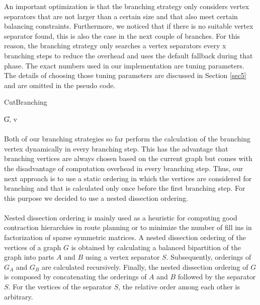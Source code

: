 \documentclass[]{article}
\begin{document}
An important optimization is that the branching strategy only considers vertex separators that are not larger than a certain size and that also meet certain balancing constraints. Furthermore, we noticed that if there is no suitable vertex separator found, this is also the case in the next couple of branches. For this reason, the branching strategy only searches a vertex separators every x branching steps to reduce the overhead and uses the default fallback during that phase. The exact numbers used in our implementation are tuning parameters. The details of choosing those tuning parameters are discussed in Section \ref{sec5} and are omitted in the pseudo code. 

\begin{algorithm}
	\caption{CutBranching}\label{alg:cut_strat}
	\DontPrintSemicolon
	
	
	\U{G, v}	
	
	
\end{algorithm}
\paragraph{}
Both of our branching strategies so far perform the calculation of the branching vertex dynamically in every branching step. This has the advantage that branching vertices are always chosen based on the current graph but comes with the disadvantage of computation overhead in every branching step. Thus, our next approach is to use a static ordering in which the vertices are considered for branching and that is calculated only once before the first branching step. For this purpose we decided to use a nested dissection ordering.

\paragraph{}
Nested dissection ordering is mainly used as a heuristic for computing good contraction hierarchies in route planning or to minimize the number of fill ins in factorization of sparse symmetric matrices.  A nested dissection ordering of the vertices of a graph $G$ is obtained by calculating a balanced bipartition of the graph into parts $A$ and $B$ using a vertex separator $S$. Subsequently, orderings of $G_A$ and $G_B$ are calculated recursively. Finally, the nested dissection ordering of $G$ is composed by concatenating the orderings of $A$ and $B$ followed by the separator $S$. For the vertices of the separator $S$, the relative order among each other is arbitrary.
\end{document}
